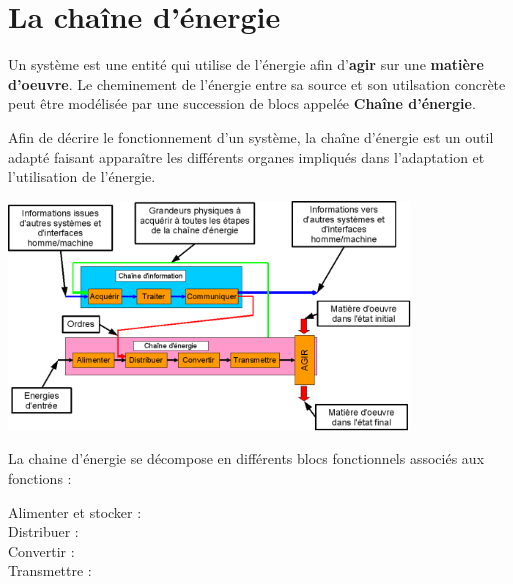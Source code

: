 \documentclass[10pt,fleqn]{article} %
\begin{document}
\section{La chaîne d'énergie}
Un système est une entité qui utilise de l'énergie afin d'\textbf{agir} sur une \textbf{matière d'oeuvre}. Le cheminement de l'énergie entre sa source et son utilsation concrète peut être modélisée par une succession de blocs appelée \textbf{Chaîne d'énergie}.

\begin{obj}
  Afin de décrire le fonctionnement d'un système, la chaîne d'énergie est un outil adapté faisant apparaître les différents organes impliqués dans l'adaptation et l'utilisation de l'énergie.
\end{obj}


\begin{center}
\vspace{0.3cm}
    \includegraphics[width=0.8\textwidth]{images/Chainefonctionnelcomplete.png}
    \vspace{0.3cm}
\end{center}

\begin{defi}
La chaine d'énergie se décompose en différents blocs fonctionnels associés aux fonctions :

    \begin{description}
  \item[Alimenter et stocker : ] 
  \item[Distribuer : ] 
  \item[Convertir : ] 
  \item[Transmettre : ] 
\end{description}
\end{defi}
\end{document}
